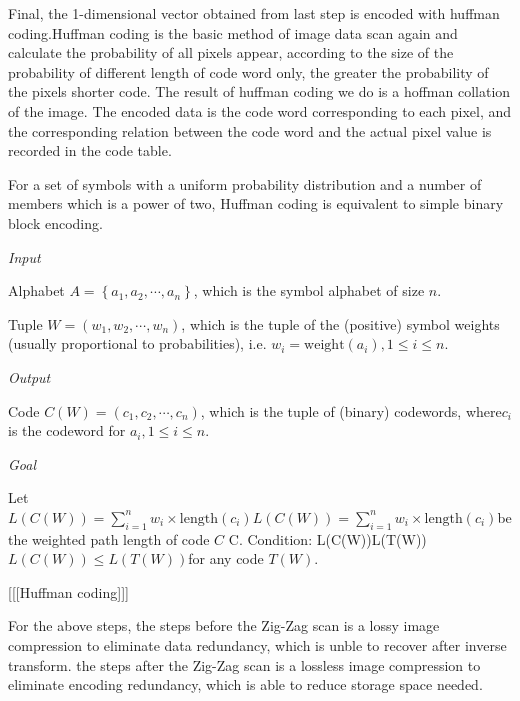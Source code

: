 \documentclass{mcmthesis}
\begin{document}
Final, the 1-dimensional vector obtained from last step is encoded with huffman coding.Huffman coding is the basic method of image data scan again and calculate the probability of all pixels appear, according to the size of the probability of different length of code word only, the greater the probability of the pixels shorter code. The result of huffman coding we do is a hoffman collation of the image. The encoded data is the code word corresponding to each pixel, and the corresponding relation between the code word and the actual pixel value is recorded in the code table.

For a set of symbols with a uniform probability distribution and a number of members which is a power of two, Huffman coding is equivalent to simple binary block encoding.

\emph{Input}

Alphabet  ${\displaystyle A=\left\{a_{1},a_{2},\cdots ,a_{n}\right\}}$, which is the symbol alphabet of size ${\displaystyle n}$.

Tuple ${\displaystyle W=(w_{1},w_{2},\cdots ,w_{n})}$, which is the tuple of the (positive) symbol weights (usually proportional to probabilities), i.e. ${\displaystyle w_{i}=\mathrm {weight} \left(a_{i}\right),1\leq i\leq n}$.

\emph{Output}

Code ${\displaystyle C\left(W\right)=(c_{1},c_{2},\cdots ,c_{n})}$, which is the tuple of (binary) codewords, where$ {\displaystyle c_{i}}$ is the codeword for ${\displaystyle a_{i},1\leq i\leq n}$.

\emph{Goal}

Let ${\displaystyle L\left(C\left(W\right)\right)=\sum _{i=1}^{n}{w_{i}\times \mathrm {length} \left(c_{i}\right)}} {\displaystyle L\left(C\left(W\right)\right)=\sum _{i=1}^{n}{w_{i}\times \mathrm {length} \left(c_{i}\right)}} $be the weighted path length of code ${\displaystyle C}$ C. Condition: {\displaystyle L\left(C\left(W\right)\right)\leq L\left(T\left(W\right)\right)} ${\displaystyle L\left(C\left(W\right)\right)\leq L\left(T\left(W\right)\right)} $for any code ${\displaystyle T\left(W\right)}$. 

[[[Huffman coding]]]

For the above steps, the steps before the Zig-Zag scan is a lossy image compression to eliminate data redundancy, which is unble to recover after inverse transform. the steps after the Zig-Zag scan is a lossless image compression to eliminate encoding redundancy, which is able to reduce storage space needed.
\end{document}

